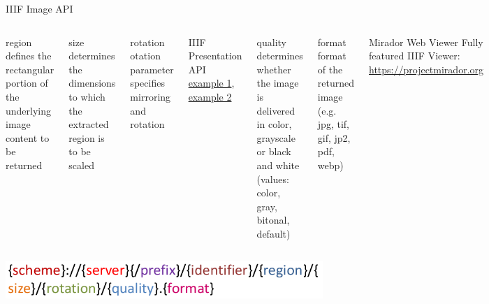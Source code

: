 \begin{frame}{IIIF Image API}

\begin{columns}
\begin{block}{region}\footnotesize
defines the rectangular portion of the
underlying image content to be returned
\end{block}

\begin{block}{size}\footnotesize
determines the dimensions to which the
extracted region is to be scaled
\end{block}

\begin{block}{rotation}\footnotesize
 otation parameter specifies mirroring and rotation
\end{block}
\begin{block}{IIIF Presentation API}\footnotesize
\href{https://jubilees.stmarytx.edu/mirador/index.html}{example 1}, 
\href{https://jubilees.stmarytx.edu/iiifp/KB_Collin-36-III-082/manifest.json}{example 2}
\end{block}

\begin{block}{quality}\footnotesize
determines whether the image is delivered in
color, grayscale or black and white (values: color, gray, bitonal, default)
\end{block} 

\begin{block}{format}\footnotesize
format of the returned image (e.g. jpg, tif, gif, jp2, pdf, webp)
\end{block} 

\begin{block}{Mirador Web Viewer}\footnotesize
Fully featured IIIF Viewer: \protect\url{https://projectmirador.org}
\end{block}


\end{columns}

\includegraphics[width=0.9\textwidth]{img/iiif-image-api.png}
\end{frame}





